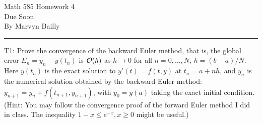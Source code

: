 \documentclass[12pt]{report}
\begin{document}
\large

\begin{center}
 Math 585 Homework 4\\
 Due Soon\\
 By Marvyn Bailly\\
\end{center}

\normalsize

\hrule



\begin{problem}
    T1: Prove the convergence of the backward Euler method, that is, the global error $E_n = y_n-y(t_n)$ is ${\mathcal{O}}(h)$ as $h \to 0$ for all $n = 0, \dots, N$, $h = (b - a)/N$. Here $y(t_n)$ is the exact solution to
    $y'(t) = f(t, y)$ at $t_n = a + nh$, and $y_n$ is the numerical solution obtained by the backward Euler method: $y_{n+1} = y_n + f(t_{n+1}, y_{n+1})$, with $y_0 = y(a)$ taking the exact initial condition.
    (Hint: You may follow the convergence proof of the forward Euler method I did in class. The inequality $1 - x \leq e^{-x} , x \geq 0$ might be useful.)
\end{problem}
\end{document}
